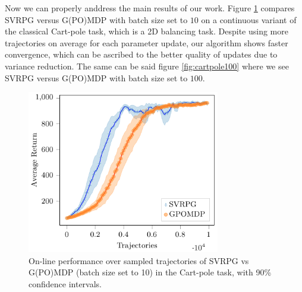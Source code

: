 Now we can properly anddress the main results of our work. Figure \ref{fig:cartpole} compares \acs{SVRPG} versus G(PO)MDP with batch size set to $10$ on a continuous variant of the classical Cart-pole task, which is a 2D balancing task. Despite using more trajectories on average for each parameter update, our algorithm shows faster convergence, which can be ascribed to the better quality of updates due to variance reduction. The same can be said \wrt figure \ref{fig:cartpole100} where we see \acs{SVRPG} versus G(PO)MDP with batch size set to $100$.
\begin{figure}[h]
	\begin{minipage}[h]{1\textwidth}
		\centering
		\includegraphics[width=0.75\textwidth]{Images/Experiments/cart_pole_SVRPG_vs_GPOMDP_tex.pdf}
		\vspace{-0.1in}
		\caption{On-line performance over sampled trajectories of \acs{SVRPG} vs G(PO)MDP (batch size set to 10) in the Cart-pole task, with 90\% confidence intervals.}
		\label{fig:cartpole}
	\end{minipage}
	\vspace{-0.15in}
\end{figure}
